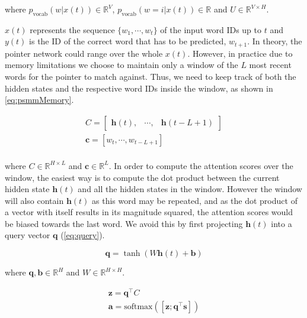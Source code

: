 where $p_{\text{vocab}}(w|x(t)) \in \mathbb{R}^{V}$, $p_{\text{vocab}}(w=i|x(t)) \in \mathbb{R}$ and $U \in \mathbb{R}^{V \times H}$.

$x(t)$ represents the sequence $\{w_1, \cdots , w_t\}$ of the input word IDs up to $t$  and $y(t)$ is the ID of the correct word that has to be predicted, $w_{t+1}$. In theory, the pointer network could range over the whole $x(t)$. However, in practice due to memory limitations we choose to maintain only a window of the $L$ most recent words for the pointer to match against. Thus, we need to keep track of both the hidden states and the respective word IDs inside the window, as shown in \autoref{eq:psmmMemory}.

\begin{equation}
	\begin{gathered}
		C = \begin{bmatrix} \mathbf{h}(t), & \cdots, & \mathbf{h}(t-L+1) \end{bmatrix} \\
		\mathbf{c} = [w_t, \cdots, w_{t-L+1}] \\
	\end{gathered}
\end{equation}

where $C \in \mathbb{R}^{H \times L}$ and $\mathbf{c} \in \mathbb{R}^{L}$. In order to compute the attention scores over the window, the easiest way is to compute the dot product between the current hidden state $\mathbf{h}(t)$ and all the hidden states in the window. However the window will also contain $\mathbf{h}(t)$ as this word may be repeated, and as the dot product of a vector with itself results in its magnitude squared, the attention scores would be biased towards the last word. We avoid this by first projecting $\mathbf{h}(t)$ into a query vector $\mathbf{q}$ (\autoref{eq:query}).

\begin{equation} \label{eq:query}
		\mathbf{q} = \tanh(W\mathbf{h}(t) + \mathbf{b}) 
\end{equation}

where $\mathbf{q},\mathbf{b} \in \mathbb{R}^{H}$ and $W \in \mathbb{R}^{H \times H}$. 

\begin{equation}
	\begin{gathered}
		\mathbf{z} = \mathbf{q}^{\top} C \\
		\mathbf{a} = \text{softmax}([\mathbf{z}; \mathbf{q}^{\top} \mathbf{s}])
	\end{gathered}
\end{equation}

